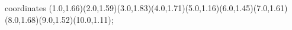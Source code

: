 					coordinates { (1.0,1.66)(2.0,1.59)(3.0,1.83)(4.0,1.71)(5.0,1.16)(6.0,1.45)(7.0,1.61)(8.0,1.68)(9.0,1.52)(10.0,1.11)};